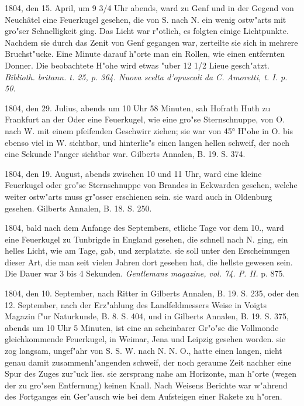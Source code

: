 \documentclass[a4paper, 11pt, oneside, polutonikogreek, german]{article}
\begin{document}
1804, den 15. April, um 9 3/4 Uhr abends, ward zu Genf und in der Gegend von Neuchâtel eine Feuerkugel gesehen, die von S. nach N. ein wenig ostw"arts mit gro"ser Schnelligkeit ging. Das Licht war r"otlich, es folgten einige Lichtpunkte. Nachdem sie durch das Zenit von Genf gegangen war, zerteilte sie sich in mehrere Bruchst"ucke. Eine Minute darauf h"orte man ein Rollen, wie einen entfernten Donner. Die beobachtete H"ohe wird etwas "uber 12 1/2 Lieue gesch"atzt. \emph{Biblioth. britann. t. 25, p. 364. Nuova scelta d'opuscoli da C. Amoretti, t. I. p. 50.}

1804, den 29. Julius, abends um 10 Uhr 58 Minuten, sah Hofrath Huth zu Frankfurt an der Oder eine Feuerkugel, wie eine gro"se Sternschnuppe, von O. nach W. mit einem pfeifenden Geschwirr ziehen; sie war von 45° H"ohe in O. bis ebenso viel in W. sichtbar, und hinterlie"s einen langen hellen schweif, der noch eine Sekunde l"anger sichtbar war. Gilberts Annalen, B. 19. S. 374.

1804, den 19. August, abends zwischen 10 und 11 Uhr, ward eine kleine Feuerkugel oder gro"se Sternschnuppe von Brandes in Eckwarden gesehen, welche weiter ostw"arts muss gr"osser erschienen sein. sie ward auch in Oldenburg gesehen. Gilberts Annalen, B. 18. S. 250.

1804, bald nach dem Anfange des Septembers, etliche Tage vor dem 10., ward eine Feuerkugel zu Tunbrigde in England gesehen, die schnell nach N. ging, ein helles Licht, wie am Tage, gab, und zerplatzte. sie soll unter den Erscheinungen dieser Art, die man seit vielen Jahren dort gesehen hat, die hellste gewesen sein. Die Dauer war 3 bis 4 Sekunden. \emph{Gentlemans magazine, vol. 74. P. II.} p. 875.

1804, den 10. September, nach Ritter in Gilberts Annalen, B. 19. S. 235, oder den 12. September, nach der Erz"ahlung des Landfeldmessers Weise in Voigts Magazin f"ur Naturkunde, B. 8. S. 404, und in Gilberts Annalen, B. 19. S. 375, abends um 10 Uhr 5 Minuten, ist eine an scheinbarer Gr"o"se die Vollmonde gleichkommende Feuerkugel, in Weimar, Jena und Leipzig gesehen worden. sie zog langsam, ungef"ahr von S. S. W. nach N. N. O., hatte einen langen, nicht genau damit zusammenh"angenden schweif, der noch geraume Zeit nachher eine Spur des Zuges zur"uck lies. sie zersprang nahe am Horizonte, man h"orte (wegen der zu gro"sen Entfernung) keinen Knall. Nach Weisens Berichte war w"ahrend des Fortganges ein Ger"ausch wie bei dem Aufsteigen einer Rakete zu h"oren.
\end{document}
